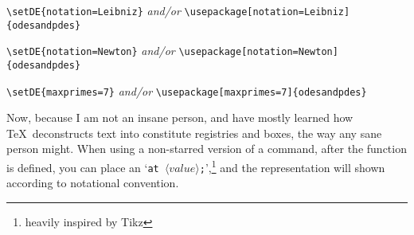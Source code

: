 \documentclass[a4paper,11pt]{ltxdoc}
\begin{document}
{%
\verb|\setDE{notation=Leibniz}| \emph{and/or} \verb|\usepackage[notation=Leibniz]{odesandpdes}|
\vspace{1em}

\verb|\setDE{notation=Newton}| \emph{and/or} \verb|\usepackage[notation=Newton]{odesandpdes}|
\vspace{1em}




\verb|\setDE{maxprimes=7}| \emph{and/or} \verb|\usepackage[maxprimes=7]{odesandpdes}|
}
\newpage

Now, because I am not an insane person, and have mostly learned how \TeX\ deconstructs text into constitute registries and boxes, the way any sane person might.
When using a non-starred version of a command, after the function is defined, you can place an `\verb|at |$\langle value\rangle$\verb|;|',\footnote{heavily inspired by Tikz} and the representation will shown according to notational convention.
\vspace{1em}
\end{document}
